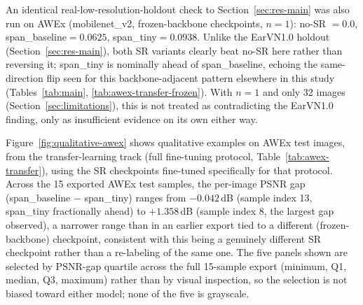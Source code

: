 \documentclass[11pt]{article}
\begin{document}
An identical real-low-resolution-holdout check to Section~\ref{sec:res-main} was also run on AWEx (mobilenet\_v2, frozen-backbone checkpoints, $n=1$): no-SR $=0.0$, span\_baseline$=0.0625$, span\_tiny$=0.0938$. Unlike the EarVN1.0 holdout (Section~\ref{sec:res-main}), both SR variants clearly beat no-SR here rather than reversing it; span\_tiny is nominally ahead of span\_baseline, echoing the same-direction flip seen for this backbone-adjacent pattern elsewhere in this study (Tables~\ref{tab:main}, \ref{tab:awex-transfer-frozen}). With $n=1$ and only 32 images (Section~\ref{sec:limitations}), this is not treated as contradicting the EarVN1.0 finding, only as insufficient evidence on its own either way.

Figure~\ref{fig:qualitative-awex} shows qualitative examples on AWEx test images, from the transfer-learning track (full fine-tuning protocol, Table~\ref{tab:awex-transfer}), using the SR checkpoints fine-tuned specifically for that protocol. Across the 15 exported AWEx test samples, the per-image PSNR gap (span\_baseline $-$ span\_tiny) ranges from $-0.042$\,dB (sample index 13, span\_tiny fractionally ahead) to $+1.358$\,dB (sample index 8, the largest gap observed), a narrower range than in an earlier export tied to a different (frozen-backbone) checkpoint, consistent with this being a genuinely different SR checkpoint rather than a re-labeling of the same one. The five panels shown are selected by PSNR-gap quartile across the full 15-sample export (minimum, Q1, median, Q3, maximum) rather than by visual inspection, so the selection is not biased toward either model; none of the five is grayscale.
\end{document}
